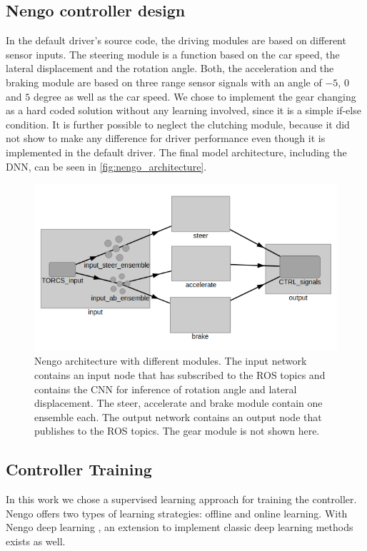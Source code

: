 \documentclass[10pt,a4paper,twoside,journal]{IEEEtran}
\begin{document}
\subsection{Nengo controller design}
In the default driver's source code, the driving modules are based on different sensor inputs. The steering module is a function based on the car speed, the lateral displacement and the rotation angle. Both, the acceleration and the braking module are based on three range sensor signals with an angle of $-5$, $0$ and $5$ degree as well as the car speed. We chose to implement the gear changing as a hard coded solution without any learning involved, since it is a simple if-else condition. It is further possible to neglect the clutching module, because it did not show to make any difference for driver performance even though it is implemented in the default driver. The final model architecture, including the DNN, can be seen in \autoref{fig:nengo_architecture}.\\
\begin{figure}[ht]
	\centering
	\includegraphics[width=\columnwidth]{attachments/nengo_architecture.png}
	\caption{Nengo architecture with different modules. The input network contains an input node that has subscribed to the ROS topics and contains the CNN for inference of rotation angle and lateral displacement. The steer, accelerate and brake module contain one ensemble each. The output network contains an output node that publishes to the ROS topics. The gear module is not shown here.}
	\label{fig:nengo_architecture}
\end{figure}

\subsection{Controller Training}
In this work we chose a supervised learning approach for training the controller. Nengo offers two types of learning strategies: offline and online learning.
With Nengo deep learning \cite{nengo_dl}, an extension to implement classic deep learning methods exists as well.
\end{document}
